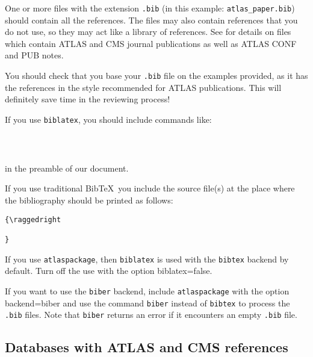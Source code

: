 \documentclass[UKenglish,texlive=2013]{latex/atlasdoc}
\newcommand*{\BibTeX}{Bib\TeX}
\newcommand{\File}[1]{\texttt{#1}\xspace}
\newcommand{\Option}[1]{\textsf{#1}\xspace}
\newcommand{\Package}[1]{\texttt{#1}\xspace}
\begin{document}
One or more files with the extension \texttt{.bib} 
(in this example: \texttt{atlas\_paper.bib}) should contain all the references. 
The files may also contain references that you do not use, so they may act like a
library of references.
See \Sect{\ref{sec:atlascmsrefs}} for details on files which contain ATLAS and CMS journal publications
as well as ATLAS CONF and PUB notes.

You should check that you base your \File{.bib} file on the examples provided,
as it has the references in the style recommended for ATLAS publications.
This will definitely save time in the reviewing process!

If you use \Package{biblatex}, you should include commands like:
%
\begin{verbatim}
  
  
\end{verbatim}
%
in the preamble of our document.

If you use traditional \BibTeX\ you include the source file(s) at the place where the bibliography should be printed as follows:
%
\begin{verbatim}
{\raggedright
  
}
\end{verbatim}

If you use \Package{atlaspackage}, then \Package{biblatex} is used with the \texttt{bibtex} backend by default.
Turn off the use with the option \Option{biblatex=false}.

If you want to use the \Package{biber} backend, include \Package{atlaspackage} with the option \Option{backend=biber} and
use the command \texttt{biber} instead of \texttt{bibtex} to process the \texttt{.bib} files.
Note that \texttt{biber} returns an error if it encounters an empty \texttt{.bib} file.


\subsection{Databases with ATLAS and CMS references}
\label{sec:atlascmsrefs}
\end{document}
